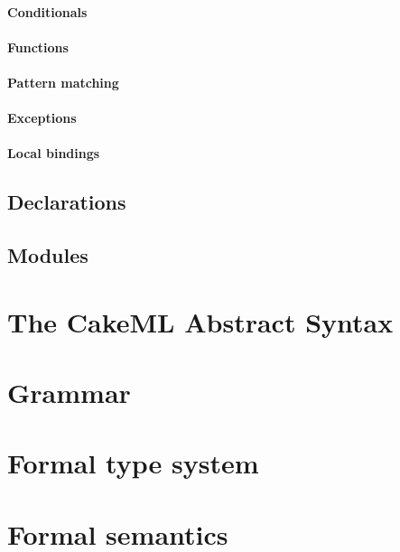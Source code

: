 \documentclass{article}
\begin{document}
\paragraph{Conditionals}

\paragraph{Functions}

\paragraph{Pattern matching}

\paragraph{Exceptions}

\paragraph{Local bindings}

\subsection{Declarations}
\label{declarations}

\subsection{Modules}

\section{The CakeML Abstract Syntax}

\appendix

\section{Grammar}

\section{Formal type system}

\section{Formal semantics}
\end{document}
